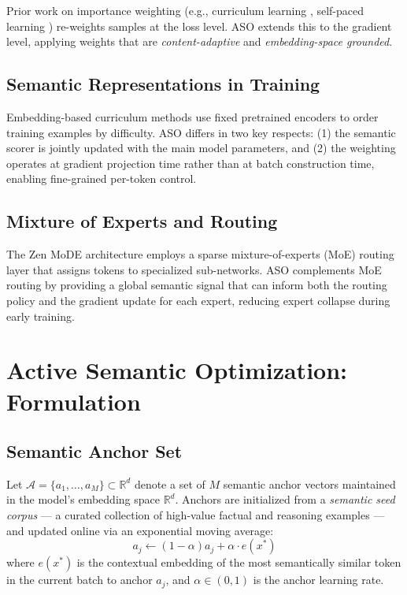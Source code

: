 \documentclass[11pt,a4paper]{article}
\begin{document}
Prior work on importance weighting (e.g., curriculum learning \cite{bengio2009curriculum},
self-paced learning \cite{kumar2010selfpaced}) re-weights samples at the loss level.
ASO extends this to the gradient level, applying weights that are \emph{content-adaptive}
and \emph{embedding-space grounded}.

\subsection{Semantic Representations in Training}

Embedding-based curriculum methods \cite{hacohen2019power} use fixed pretrained encoders
to order training examples by difficulty. ASO differs in two key respects: (1) the
semantic scorer is jointly updated with the main model parameters, and (2) the weighting
operates at gradient projection time rather than at batch construction time, enabling
fine-grained per-token control.

\subsection{Mixture of Experts and Routing}

The Zen MoDE architecture employs a sparse mixture-of-experts (MoE) routing layer that
assigns tokens to specialized sub-networks. ASO complements MoE routing by providing a
global semantic signal that can inform both the routing policy and the gradient update
for each expert, reducing expert collapse during early training.

\section{Active Semantic Optimization: Formulation}
\label{sec:formulation}

\subsection{Semantic Anchor Set}

Let $\mathcal{A} = \{a_1, \ldots, a_M\} \subset \mathbb{R}^d$ denote a set of $M$
semantic anchor vectors maintained in the model's embedding space $\mathbb{R}^d$.
Anchors are initialized from a \emph{semantic seed corpus} — a curated collection of
high-value factual and reasoning examples — and updated online via an exponential moving
average:
\begin{equation}
    a_j \leftarrow (1-\alpha) a_j + \alpha \cdot e(x^*)
    \label{eq:anchor_update}
\end{equation}
where $e(x^*)$ is the contextual embedding of the most semantically similar token in
the current batch to anchor $a_j$, and $\alpha \in (0,1)$ is the anchor learning rate.
\end{document}
